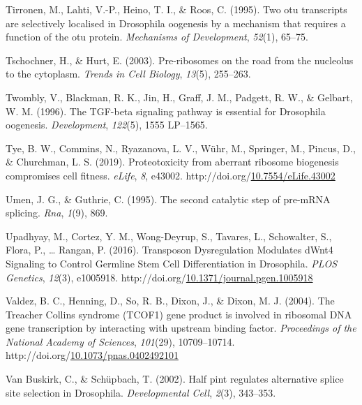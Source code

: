\documentclass[12pt,oneside]{reedthesis}
\newlength{\cslhangindent}
\newenvironment{CSLReferences}[2] %
 {%
  \setlength{\parindent}{0pt}
  \ifodd #1 \everypar{\setlength{\hangindent}{\cslhangindent}}\ignorespaces\fi
  \ifnum #2 > 0
  \setlength{\parskip}{#2\baselineskip}
  \fi
 }%
 {}
\begin{document}
\begin{CSLReferences}{1}{0}
\leavevmode{}%
Tirronen, M., Lahti, V.-P., Heino, T. I., \& Roos, C. (1995). Two otu transcripts are selectively localised in {Drosophila} oogenesis by a mechanism that requires a function of the otu protein. \emph{Mechanisms of Development}, \emph{52}(1), 65--75.

\leavevmode{}%
Tschochner, H., \& Hurt, E. (2003). Pre-ribosomes on the road from the nucleolus to the cytoplasm. \emph{Trends in Cell Biology}, \emph{13}(5), 255--263.

\leavevmode{}%
Twombly, V., Blackman, R. K., Jin, H., Graff, J. M., Padgett, R. W., \& Gelbart, W. M. (1996). The {TGF-beta} signaling pathway is essential for {Drosophila} oogenesis. \emph{Development}, \emph{122}(5), 1555 LP--1565.

\leavevmode{}%
Tye, B. W., Commins, N., Ryazanova, L. V., Wühr, M., Springer, M., Pincus, D., \& Churchman, L. S. (2019). Proteotoxicity from aberrant ribosome biogenesis compromises cell fitness. \emph{eLife}, \emph{8}, e43002. http://doi.org/\href{https://doi.org/10.7554/eLife.43002}{10.7554/eLife.43002}

\leavevmode{}%
Umen, J. G., \& Guthrie, C. (1995). The second catalytic step of pre-{mRNA} splicing. \emph{Rna}, \emph{1}(9), 869.

\leavevmode{}%
Upadhyay, M., Cortez, Y. M., Wong-Deyrup, S., Tavares, L., Schowalter, S., Flora, P., \ldots{} Rangan, P. (2016). Transposon {Dysregulation Modulates dWnt4 Signaling} to {Control Germline Stem Cell Differentiation} in {Drosophila}. \emph{PLOS Genetics}, \emph{12}(3), e1005918. http://doi.org/\href{https://doi.org/10.1371/journal.pgen.1005918}{10.1371/journal.pgen.1005918}

\leavevmode{}%
Valdez, B. C., Henning, D., So, R. B., Dixon, J., \& Dixon, M. J. (2004). The {Treacher Collins} syndrome ({TCOF1}) gene product is involved in ribosomal {DNA} gene transcription by interacting with upstream binding factor. \emph{Proceedings of the National Academy of Sciences}, \emph{101}(29), 10709--10714. http://doi.org/\href{https://doi.org/10.1073/pnas.0402492101}{10.1073/pnas.0402492101}

\leavevmode{}%
Van Buskirk, C., \& Schüpbach, T. (2002). Half pint regulates alternative splice site selection in {Drosophila}. \emph{Developmental Cell}, \emph{2}(3), 343--353.


\end{CSLReferences}
\end{document}
